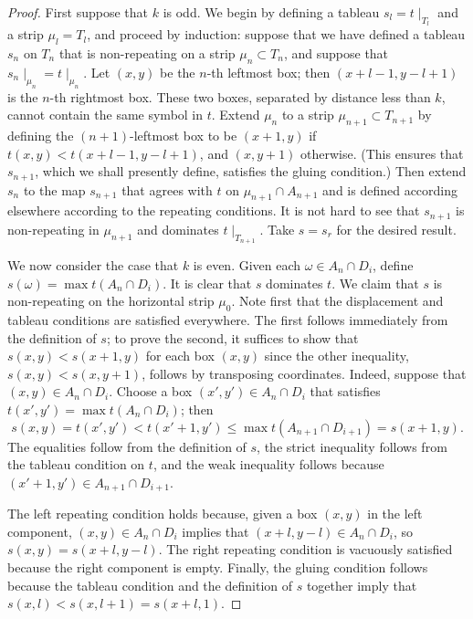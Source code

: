 \documentclass[11pt,reqno]{amsart}
\newcommand*{\restrict}[1]{{\mid}_{#1}}
\theoremstyle{definition}
\theoremstyle{problem}
\theoremstyle{plain}
\theoremstyle{remark}
\theoremstyle{theorem}
\numberwithin{equation}{section}
\numberwithin{figure}{section}
\begin{document}
\begin{proof}
  First suppose that $k$ is odd.  We begin by defining a tableau
  $s_l = t\restrict{T_l}$ and a strip $\mu_l = T_l$, and proceed by
  induction: suppose that we have defined a tableau $s_n$ on $T_n$
  that is non-repeating on a strip $\mu_n \subset T_n$, and suppose
  that $s_n\restrict{\mu_n} = t\restrict{\mu_n}$.  Let $(x,y)$ be the
  $n$-th leftmost box; then $(x+l-1,y-l+1)$ is the $n$-th rightmost
  box.  These two boxes, separated by distance less than $k$, cannot
  contain the same symbol in $t$.  Extend $\mu_n$ to a strip
  $\mu_{n+1} \subset T_{n+1}$ by defining the $(n+1)$-leftmost box to
  be $(x+1,y)$ if $t(x,y) < t(x+l-1,y-l+1)$, and $(x,y+1)$ otherwise.
  (This ensures that $s_{n+1}$, which we shall presently define,
  satisfies the gluing condition.)  Then extend $s_n$ to the map
  $s_{n+1}$ that agrees with $t$ on $\mu_{n+1} \cap A_{n+1}$ and is
  defined according elsewhere according to the repeating conditions.
  It is not hard to see that $s_{n+1}$ is non-repeating in $\mu_{n+1}$
  and dominates $t\restrict{T_{n+1}}$.  Take $s = s_r$ for the desired
  result.
 
  We now consider the case that $k$ is even.  Given each
  $\omega \in A_n \cap D_i$, define
  $s(\omega) = \max t(A_n \cap D_i)$.  It is clear that $s$ dominates
  $t$.  We claim that $s$ is non-repeating on the horizontal strip
  $\mu_0$.  Note first that the displacement and tableau conditions
  are satisfied everywhere.  The first follows immediately from the
  definition of $s$; to prove the second, it suffices to show that
  $s(x,y) < s(x+1,y)$ for each box $(x,y)$ since the other inequality,
  $s(x,y) < s(x,y+1)$, follows by transposing coordinates.  Indeed,
  suppose that $(x,y) \in A_n \cap D_i$.  Choose a box
  $(x',y') \in A_n \cap D_i$ that satisfies
  $t(x',y') = \max t(A_n \cap D_i)$; then
  \begin{equation*}
    s(x,y) = t(x',y') < t(x'+1,y') \leq \max t(A_{n+1} \cap D_{i+1})
           = s(x+1,y).
  \end{equation*}
  The equalities follow from the definition of $s$, the strict
  inequality follows from the tableau condition on $t$, and the weak
  inequality follows because $(x'+1,y') \in A_{n+1} \cap D_{i+1}$.
  
  The left repeating condition holds because, given a box $(x,y)$ in
  the left component, $(x,y) \in A_n \cap D_i$ implies that
  $(x+l,y-l) \in A_n \cap D_i$, so $s(x,y) = s(x+l,y-l)$.  The right
  repeating condition is vacuously satisfied because the right
  component is empty.  Finally, the gluing condition follows because
  the tableau condition and the definition of $s$ together imply that
  $s(x,l) < s(x,l+1) = s(x+l,1)$.
\end{proof}
\end{document}
